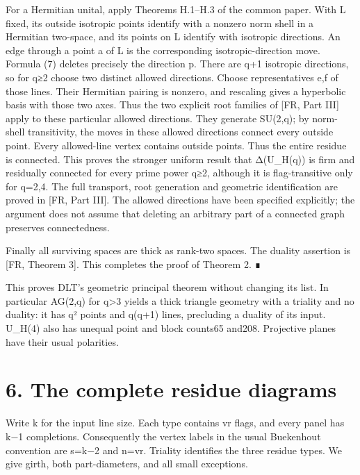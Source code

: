 \documentclass[
  11pt,
  a4paper,
]{article}
\begin{document}
For a Hermitian unital, apply Theorems H.1--H.3 of the common paper.
With L fixed, its outside isotropic points identify with a nonzero norm
shell in a Hermitian two-space, and its points on L identify with
isotropic directions. An edge through a point a of L is the
corresponding isotropic-direction move. Formula (7) deletes precisely
the direction p. There are q+1 isotropic directions, so for q≥2 choose
two distinct allowed directions. Choose representatives e,f of those
lines. Their Hermitian pairing is nonzero, and rescaling gives a
hyperbolic basis with those two axes. Thus the two explicit root
families of [FR, Part III] apply to these particular allowed
directions. They generate SU(2,q); by norm-shell transitivity, the moves
in these allowed directions connect every outside point. Every
allowed-line vertex contains outside points. Thus the entire residue is
connected. This proves the stronger uniform result that Δ(U\_H(q)) is
firm and residually connected for every prime power q≥2, although it is
flag-transitive only for q=2,4. The full transport, root generation and geometric identification are
proved in [FR, Part III]. The allowed directions have been specified
explicitly; the argument does not assume that deleting an arbitrary
part of a connected graph preserves connectedness.

Finally all surviving spaces are thick as rank-two spaces. The duality
assertion is {[}FR, Theorem 3{]}. This completes the proof of Theorem 2.
∎

This proves DLT's geometric principal theorem without changing its list.
In particular AG(2,q) for q\textgreater3 yields a thick triangle
geometry with a triality and no duality: it has q² points and q(q+1)
lines, precluding a duality of its input. U\_H(4) also has unequal point
and block counts65 and208. Projective planes have their usual
polarities.

\section{6. The complete residue
diagrams}\label{the-complete-residue-diagrams}

Write k for the input line size. Each type contains vr flags, and every
panel has k−1 completions. Consequently the vertex labels in the usual
Buekenhout convention are s=k−2 and n=vr. Triality identifies the three
residue types. We give girth, both part-diameters, and all small
exceptions.
\end{document}
